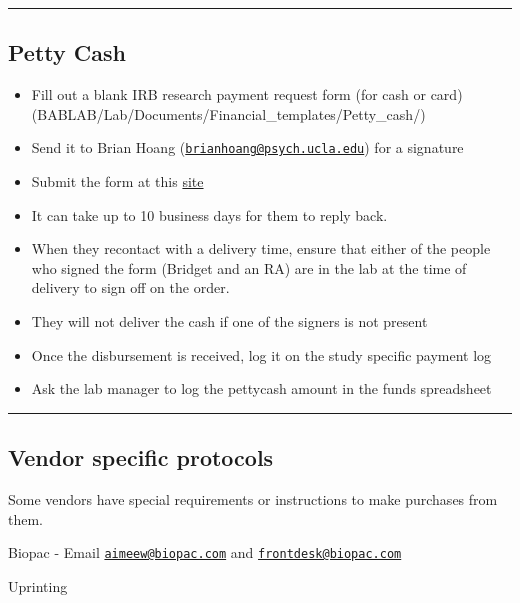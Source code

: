 \documentclass[]{book}
\providecommand{\tightlist}{%
  \setlength{\itemsep}{0pt}\setlength{\parskip}{0pt}}
\begin{document}
\begin{center}\rule{0.5\linewidth}{0.5pt}\end{center}

\subsection{Petty Cash}\label{petty-cash}

\begin{itemize}
\tightlist
\item
  Fill out a blank IRB research payment request form (for cash or
  card)(BABLAB/Lab/Documents/Financial\_templates/Petty\_cash/)
\item
  Send it to Brian Hoang
  (\href{mailto:brianhoang@psych.ucla.edu}{\nolinkurl{brianhoang@psych.ucla.edu}})
  for a signature
\item
  Submit the form at this
  \href{https://sa.ucla.edu/MessageCenter/OneStop/Home/PostMessage?topicId=293}{site}
\item
  It can take up to 10 business days for them to reply back.
\item
  When they recontact with a delivery time, ensure that either of the
  people who signed the form (Bridget and an RA) are in the lab at the
  time of delivery to sign off on the order.
\item
  They will not deliver the cash if one of the signers is not present
\item
  Once the disbursement is received, log it on the study specific
  payment log
\item
  Ask the lab manager to log the pettycash amount in the funds
  spreadsheet
\end{itemize}

\begin{center}\rule{0.5\linewidth}{0.5pt}\end{center}

\subsection{Vendor specific protocols}\label{vendor-specific-protocols}

Some vendors have special requirements or instructions to make purchases
from them.

Biopac - Email
\href{mailto:aimeew@biopac.com}{\nolinkurl{aimeew@biopac.com}} and
\href{mailto:frontdesk@biopac.com}{\nolinkurl{frontdesk@biopac.com}}

Uprinting
\end{document}
